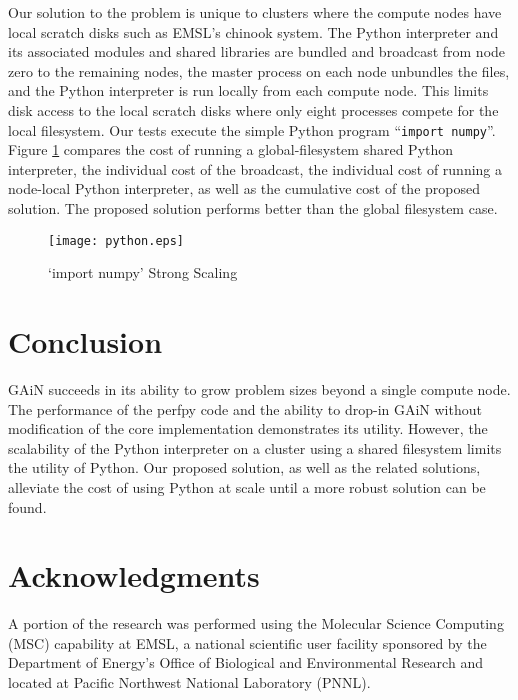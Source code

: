 \documentclass{sig-alt-release2}
\begin{document}
Our solution to the problem is unique to clusters where the compute nodes have
local scratch disks such as EMSL's chinook system. The Python interpreter and
its associated modules and shared libraries are bundled and broadcast from node
zero to the remaining nodes, the master process on each node unbundles the
files, and the Python interpreter is run locally from each compute node. This
limits disk access to the local scratch disks where only eight processes
compete for the local filesystem. Our tests execute the simple Python program
``\texttt{import numpy}''. Figure \ref{fig:python} compares the cost of running
a global-filesystem shared Python interpreter, the individual cost of the
broadcast, the individual cost of running a node-local Python interpreter, as
well as the cumulative cost of the proposed solution. The proposed solution
performs better than the global filesystem case.

\begin{figure}
\centering
\texttt{[image: python.eps]}
\caption{`import numpy' Strong Scaling}
\label{fig:python}
\end{figure}

\section{Conclusion}
GAiN succeeds in its ability to grow problem sizes beyond a single compute
node. The performance of the perfpy code and the ability to drop-in GAiN
without modification of the core implementation demonstrates its utility. However, the scalability of the Python interpreter on a cluster using a shared filesystem limits the utility of Python. Our proposed solution, as well as the related solutions\cite{Scu11,Man11}, alleviate the cost of using Python at scale until a more robust solution can be found.

\section{Acknowledgments}
A portion of the research was performed using the Molecular Science Computing
(MSC) capability at EMSL, a national scientific user facility sponsored by the
Department of Energy's Office of Biological and Environmental Research and
located at Pacific Northwest National Laboratory (PNNL). %

%


%
%
\end{document}
